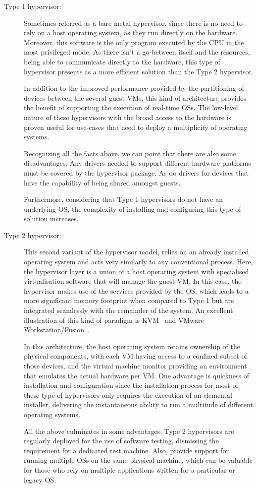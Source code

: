 \begin{description}
	\item [Type 1 hypervisor:] Sometimes referred as a bare-metal hypervisor, since there is no need to rely on a host operating system, as they run directly on the hardware. Moreover, this software is the only program executed by the CPU in the most privileged mode. As there isn't a go-between itself and the resources, being able to communicate directly to the hardware, this type of hypervisor presents as a more efficient solution than the Type 2 hypervisor.

	In addition to the improved performance provided by the partitioning of devices between the several guest VMs, this kind of architecture provides the benefit of supporting the execution of real-time OSs. The low-level nature of these hypervisors with the broad access to the hardware is proven useful for use-cases that need to deploy a multiplicity of operating systems.
	
	Recognizing all the facts above, we can point that there are also some disadvantages. Any drivers needed to support different hardware platforms must be covered by the hypervisor package. As do drivers for devices that have the capability of being shared amongst guests.
	
	Furthermore, considering that Type 1 hypervisors do not have an underlying OS, the complexity of installing and configuring this type of solution increases.
	\item [Type 2 hypervisor:] This second variant of the hypervisor model, relies on an already installed operating system and acts very similarly to any conventional process. Here, the hypervisor layer is a union of a host operating system with specialised virtualisation software that will manage the guest VM. In this case, the hypervisor makes use of the services provided by the OS, which leads to a more significant memory footprint when compared to Type 1 but are integrated seamlessly with the remainder of the system. An excellent illustration of this kind of paradigm is \gls{KVM}~\cite{Kivity2007} and VMware Workstation/Fusion~\cite{Agesen2010}.
	
	In this architecture, the host operating system retains ownership of the physical components, with each VM having access to a confined subset of those devices, and the virtual machine monitor providing an environment that emulates the actual hardware per VM. One advantage is quickness of installation and configuration since the installation process for most of these type of hypervisors only requires the execution of an elemental installer, delivering the instantaneous ability to run a multitude of different operating systems.
	
	All the above culminates in some advantages. Type 2 hypervisors are regularly deployed for the use of software testing, dismissing the requirement for a dedicated test machine. Also, provide support for running multiple OSs on the same physical machine, which can be valuable for those who rely on multiple applications written for a particular or legacy OS.
\end{description}

